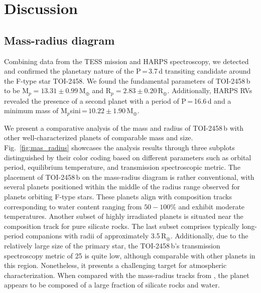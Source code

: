 \documentclass[traditabstract,longauth]{aa}
\begin{document}


%
%


\section{Discussion} \label{sec:discussion}
\subsection{Mass-radius diagram}\label{sec:mass-radius}

Combining data from the TESS mission and HARPS spectroscopy, we detected and confirmed the planetary nature of the P\,=\,3.7\,d transiting candidate around the F-type star TOI-2458. We found the fundamental parameters of TOI-2458\,b to be M$_p=13.31\pm0.99$\,M$_{\oplus}$ and R$_p=2.83\pm0.20$\,R$_{\oplus}$. Additionally, HARPS RVs revealed the presence of a second planet with a period of P\,=\,16.6\,d and a minimum mass of M$_p$sini\,=\,$10.22\pm1.90$\,M$_{\oplus}$.

We present a comparative analysis of the mass and radius of TOI-2458\,b with other well-characterized planets of comparable mass and size. Fig.~\ref{fig:mas_radius} showcases the analysis results through three subplots distinguished by their color coding based on different parameters such as orbital period, equilibrium temperature, and transmission spectroscopic metric. 
The placement of TOI-2458\,b on the mass-radius diagram is rather conventional, with several planets positioned within the middle of the radius range observed for planets orbiting F-type stars. These planets align with composition tracks corresponding to water content ranging from $50-100\%$ and exhibit moderate temperatures. Another subset of highly irradiated planets is situated near the composition track for pure silicate rocks. The last subset comprises typically long-period companions with radii of approximately 3.5\,R$_{\oplus}$.
Additionally, due to the relatively large size of the primary star, the TOI-2458\,b's transmission spectroscopy metric of 25 is quite low, although comparable with other planets in this region. Nonetheless, it presents a challenging target for atmospheric characterization. When compared with the mass-radius tracks from \citet{Zeng19}, the planet appears to be composed of a large fraction of silicate rocks and water.
\end{document}
